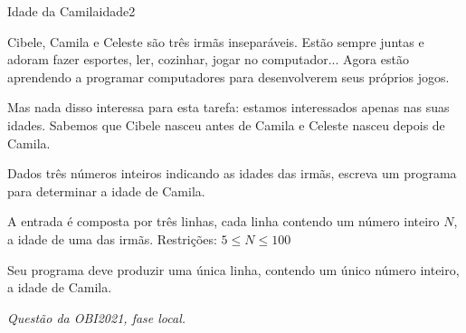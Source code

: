\documentclass[12pt,a4paper,oneside]{article}
\begin{document}
\begin{problem}{Idade da Camila}{idade}{2}

Cibele, Camila e Celeste são três irmãs inseparáveis. Estão sempre juntas e adoram fazer esportes, ler, cozinhar, jogar no computador... Agora estão aprendendo a programar computadores para desenvolverem seus próprios jogos.

Mas nada disso interessa para esta tarefa: estamos interessados apenas nas suas idades. Sabemos que Cibele nasceu antes de Camila e Celeste nasceu depois de Camila.

Dados três números inteiros indicando as idades das irmãs, escreva um programa para determinar a idade de Camila.

%

\InputFile

A entrada é composta por três linhas, cada linha contendo um número inteiro $N$, a idade de uma das irmãs.
Restrições: $5 \leq N \leq 100$

\OutputFile

Seu programa deve produzir uma única linha, contendo um único número inteiro, a idade de Camila.


\Example

\begin{example}
%
\end{example}

\begin{example}
%
\end{example}

\begin{example}
%
\end{example}

\begin{example}
%
\end{example}

\textit{Questão da OBI2021, fase local.}

\end{problem}
\end{document}
